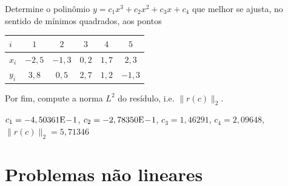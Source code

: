 \begin{exer}\label{exer:mq_poli}
  Determine o polinômio $y = c_1x^3 + c_2x^2 + c_3x + c_4$ que melhor se ajusta, no sentido de mínimos quadrados, aos pontos
  \begin{center}
    \begin{tabular}{l|ccccc}
      $i$ & $1$ & $2$ & $3$ & $4$ & $5$ \\\hline
      $x_i$ & $-2,5$ & $-1,3$ & $0,2$ & $1,7$ & $2,3$\\
      $y_i$ & $3,8$ & $0,5$ & $2,7$ & $1,2$ & $-1,3$\\\hline
    \end{tabular}
  \end{center}
Por fim, compute a norma $L^2$ do resídulo, i.e. $\|r(c)\|_2$.
\end{exer}
\begin{resp}
  $c_1 = -4,50361\mathrm{E}\!-\!1$, $c_2 = -2,78350\mathrm{E}\!-\!1$, $c_3 = 1,46291$, $c_4 = 2,09648$, $\|r(c)\|_2 = 5,71346$
\end{resp}

\emconstrucao

\section{Problemas não lineares}\label{cap_ajuste_sec_prob_nlin}

